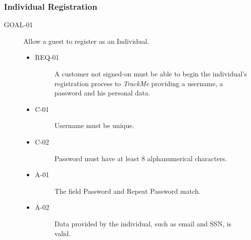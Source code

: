 \documentclass[a4paper]{article}
\newcommand{\requirement}{\ding{229}}%
\begin{document}
        \subsubsection{Individual Registration}
		\begin{description}
        	\item[GOAL-01] Allow a guest to register as an Individual.
                    \begin{itemize}
            	    \item[\requirement]
                	\begin{description}
                	\item[REQ-01] A customer not signed-on must be able to begin the individual's registration process to \textit{TrackMe} providing a username, a password and his personal data.
                	\end{description}
                	\item
                	\begin{description}
                	\item[C-01] Username must be unique.
                	\end{description}
                	\item
                	\begin{description}
                	\item[C-02] Password must have at least 8 alphanumerical characters.
                	\end{description}
                	\item
                	\begin{description}
                	\item[A-01] The field Password and Repeat Password match.
                	\end{description}
                	\item
                	\begin{description}
                	\item[A-02] Data provided by the individual, such as email and SSN, is valid.
                	\end{description}
                	\end{itemize}
        \end{description} 
        
\end{document}
